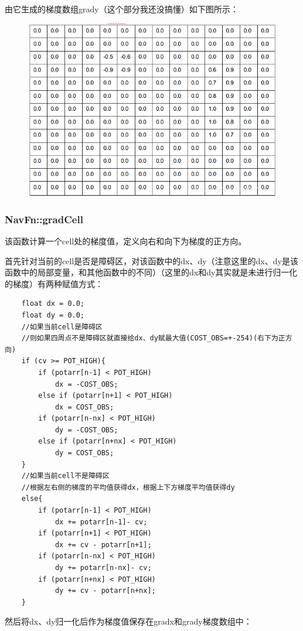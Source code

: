 \documentclass[9pt, oneside]{book}
\begin{document}
由它生成的梯度数组grady（这个部分我还没搞懂）如下图所示：

\begin{figure}[H]
    \centering
    \includegraphics[width=0.7\linewidth]{image/example_grady.png}
\end{figure}

\subsubsection{NavFn::gradCell}

该函数计算一个cell处的梯度值，定义向右和向下为梯度的正方向。

首先针对当前的cell是否是障碍区，对该函数中的dx、dy（注意这里的dx、dy是该函数中的局部变量，和其他函数中的不同）（这里的dx和dy其实就是未进行归一化的梯度）有两种赋值方式：

\small
\begin{verbatim}
    float dx = 0.0;
    float dy = 0.0;
    //如果当前cell是障碍区 
    //则如果四周点不是障碍区就直接给dx、dy赋最大值(COST_OBS=+-254)(右下为正方向)
    if (cv >= POT_HIGH){
        if (potarr[n-1] < POT_HIGH)
            dx = -COST_OBS;
        else if (potarr[n+1] < POT_HIGH)
            dx = COST_OBS;
        if (potarr[n-nx] < POT_HIGH)
            dy = -COST_OBS;
        else if (potarr[n+nx] < POT_HIGH)
            dy = COST_OBS;
    }
    //如果当前cell不是障碍区 
    //根据左右侧的梯度的平均值获得dx，根据上下方梯度平均值获得dy
    else{
        if (potarr[n-1] < POT_HIGH)
            dx += potarr[n-1]- cv;	
        if (potarr[n+1] < POT_HIGH)
            dx += cv - potarr[n+1]; 
        if (potarr[n-nx] < POT_HIGH)
            dy += potarr[n-nx]- cv;	
        if (potarr[n+nx] < POT_HIGH)
            dy += cv - potarr[n+nx]; 
    }
\end{verbatim}
\normalsize

然后将dx、dy归一化后作为梯度值保存在gradx和grady梯度数组中：
\end{document}
